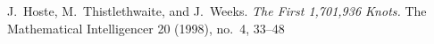\begin{paper}









\begin{thebibliography}{}
J.~Hoste, M.~Thistlethwaite, and J.~Weeks.
\textit{The First 1,701,936 Knots.}
The Mathematical Intelligencer 20 (1998), no.~4, 33--48
\end{thebibliography}


\end{paper}

